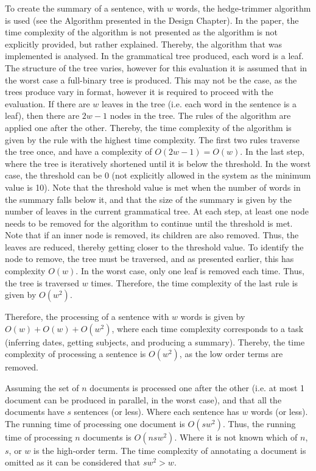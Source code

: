 \par To create the summary of a sentence, with $w$ words, the hedge-trimmer algorithm is used (see the Algorithm presented in the Design Chapter). In the paper, the time complexity of the algorithm is not presented as the algorithm is not explicitly provided, but rather explained. Thereby, the algorithm that was implemented is analysed. In the grammatical tree produced, each word is a leaf. The structure of the tree varies, however for this evaluation it is assumed that in the worst case a full-binary tree is produced. This may not be the case, as the trees produce vary in format, however it is required to proceed with the evaluation. If there are $w$ leaves in the tree (i.e. each word in the sentence is a leaf), then there are $2w-1$ nodes in the tree. The rules of the algorithm are applied one after the other. Thereby, the time complexity of the algorithm is given by the rule with the highest time complexity. The first two rules traverse the tree once, and have a complexity of $O(2w-1) = O(w)$. In the last step, where the tree is iteratively shortened until it is below the threshold. In the worst case, the threshold can be 0 (not explicitly allowed in the system as the minimum value is 10). Note that the threshold value is met when the number of words in the summary falls below it, and that the size of the summary is given by the number of leaves in the current grammatical tree. At each step, at least one node needs to be removed for the algorithm to continue until the threshold is met. Note that if an inner node is removed, its children are also removed. Thus, the leaves are reduced, thereby getting closer to the threshold value. To identify the node to remove, the tree must be traversed, and as presented earlier, this has complexity $O(w)$. In the worst case, only one leaf is removed each time. Thus, the tree is traversed $w$ times. Therefore, the time complexity of the last rule is given by $O(w^2)$.

\par Therefore, the processing of a sentence with $w$ words is given by $O(w)+O(w)+O(w^2)$, where each time complexity corresponds to a task (inferring dates, getting subjects, and producing a summary). Thereby, the time complexity of processing a sentence is $O(w^2)$, as the low order terms are removed. 
\par Assuming the set of $n$ documents is processed one after the other (i.e. at most 1 document can be produced in parallel, in the worst case), and that all the documents have $s$ sentences (or less). Where each sentence has $w$ words (or less). The running time of processing one document is $O(sw^2)$. Thus, the running time of processing $n$ documents is $O(nsw^2)$. Where it is not known which of $n$, $s$, or $w$ is the high-order term. The time complexity of annotating a document is omitted as it can be considered that $sw^2 > w$.

